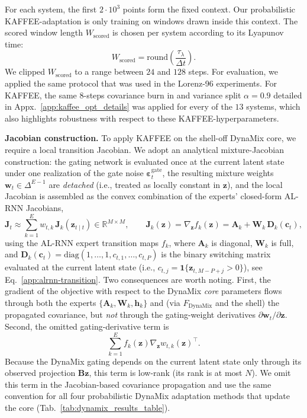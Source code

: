 \documentclass{article}
\theoremstyle{plain}
\theoremstyle{definition}
\theoremstyle{remark}
\newcommand{\R}{\mathbb{R}}
\begin{document}
For each system, the first $2\cdot 10^3$ points form the fixed context. Our probabilistic KAFFEE-adaptation is only training on windows drawn inside this context. The scored window length $W_{\mathrm{scored}}$ is chosen per system according to its Lyapunov time:
\[
 W_{\mathrm{scored}} = \mathrm{round}\left(\frac{\tau_\lambda}{\Delta t}\right).
\]
We clipped $W_{\mathrm{scored}}$ to a range between $24$ and $128$ steps. For evaluation, we applied the same protocol that was used in the Lorenz-96 experiments. For KAFFEE, the same $8$-steps covariance burn in and variance split $\alpha = 0.9$ detailed in Appx.~\ref{app:kaffee_opt_details} was applied for every of the $13$ systems, which also highlights robustness with respect to these KAFFEE-hyperparameters.

\textbf{Jacobian construction.} To apply KAFFEE on the shell-off DynaMix core, we require a local transition Jacobian. We adopt an analytical mixture-Jacobian construction: the gating network is evaluated once at the current latent state under one realization of the gate noise $\bm \varepsilon^{\mathrm{gate}}_t$, the resulting mixture weights $\bm w_t \in \Delta^{E-1}$ are \emph{detached} (i.e., treated as locally constant in $\bm z$), and the local Jacobian is assembled as the convex combination of the experts' closed-form AL-RNN Jacobians,
\[
\bm J_t
\approx
\sum_{k=1}^{E} w_{t,k}\, \bm J_k(\bm z_{t\mid t})
\in\R^{M\times M},
\qquad
\bm J_k(\bm z) = \nabla_{\bm z} f_k(\bm z) =\bm A_k + \bm W_k\,\bm D_k(\bm c_t),
\]
using the AL-RNN expert transition maps $f_k$, where $\bm A_k$ is diagonal, $\bm W_k$ is full, and $\bm D_k(\bm c_t)=\mathrm{diag}(1,\ldots,1,c_{t,1},\ldots,c_{t,P})$ is the binary switching matrix evaluated at the current latent state (i.e., $c_{t,j}=\mathbf{1}\{\bm z_{t,M-P+j}>0\}$), see Eq.~\ref{app:alrnn-transition}. Two consequences are worth noting. First, the gradient of the objective with respect to the DynaMix \emph{core} parameters flows through both the experts $\{\bm A_k,\bm W_k,\bm h_k\}$ and (via $F_{\mathrm{DynaMix}}$ and the shell) the propagated covariance, but \emph{not} through the gating-weight derivatives $\partial \bm w_t/\partial \bm z$. Second, the omitted gating-derivative term is
\[
\sum_{k=1}^E f_k(\bm z)\nabla_{\bm z} w_{t,k}(\bm z)^\top.
\]
Because the DynaMix gating depends on the current latent state only through its observed projection $\bm B\bm z$, this term is low-rank (its rank is at most $N$). We omit this term in the Jacobian-based covariance propagation and use the same convention  for all four probabilistic DynaMix adaptation methods that update the core (Tab.~\ref{tab:dynamix_results_table}).
\end{document}
